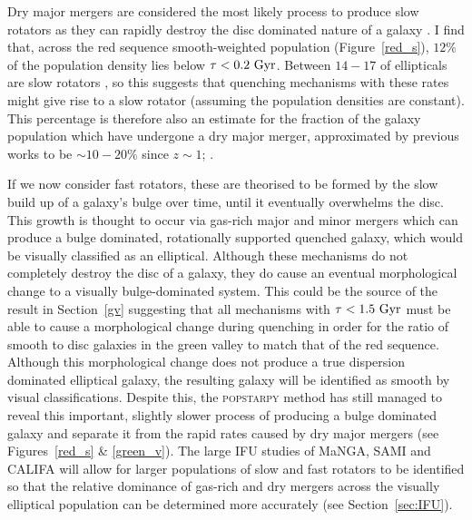 Dry major mergers are considered the most likely process to produce slow rotators \citep{duc11, naab14} as they can rapidly destroy the disc dominated nature of a galaxy \citep{toomre72}. I find that, across the red sequence smooth-weighted population (Figure~\ref{red_s}), $12\%$ of the population density lies below $\tau <0.2~\rm{Gyr}$. Between $14-17$ of ellipticals are slow rotators \citep{emsellem11, stott16}, so this suggests that quenching mechanisms with these rates might give rise to a slow rotator (assuming the population densities are constant). This percentage is therefore also an estimate for the fraction of the galaxy population which have undergone a dry major merger, approximated by previous works to be $\sim10-20\%$ since $z\sim1$; \citep[][]{khochfar09}.

If we now consider fast rotators, these are theorised to be formed by the slow build up of a galaxy's bulge over time, until it eventually overwhelms the disc. This growth is thought to occur via gas-rich major and minor mergers \citep{duc11} which can produce a bulge dominated, rotationally supported quenched galaxy, which would be visually classified as an elliptical. Although these mechanisms do not completely destroy the disc of a galaxy, they do cause an eventual morphological change to a visually bulge-dominated system. This could be the source of the result in Section~\ref{gv} suggesting that all mechanisms with $\tau < 1.5 ~\rm{Gyr}$ must be able to cause a morphological change during quenching in order for the ratio of smooth to disc galaxies in the green valley to match that of the red sequence. Although this morphological change does not produce a true dispersion dominated elliptical galaxy, the resulting galaxy will be identified as smooth by visual classifications. Despite this, the \textsc{popstarpy} method has still managed to reveal this important, slightly slower process of producing a bulge dominated galaxy and separate it from the rapid rates caused by dry major mergers (see Figures~\ref{red_s} \& \ref{green_v}). The large IFU studies of MaNGA, SAMI and CALIFA will allow for larger populations of slow and fast rotators to be identified so that the relative dominance of gas-rich and dry mergers across the visually elliptical population can be determined more accurately (see Section~\ref{sec:IFU}). 

